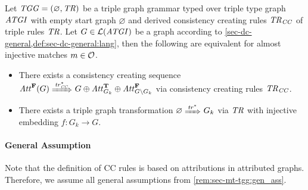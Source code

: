 \begin{fact}
\label{fact:sec-msynch-tgg:equ_tr_cc}
Let $\mathit{TGG}=(\varnothing,\mathit{TR})$ be a triple graph grammar typed over triple type graph $\mathit{ATGI}$ with empty start graph $\varnothing$ and derived consistency creating rules $\mathit{TR}_\mathit{CC}$ of triple rules $\mathit{TR}$.
Let $G \in \mathcal{L}(\mathit{ATGI})$ be a graph according to \cref{sec-dc-general,def:sec-dc-general:lang}, then the following are equivalent for almost injective matches $m \in {\cal O}$.
\begin{itemize}
	\item There exists a consistency creating sequence $\Att^\False(G) \Trans{\tr_\CC^*} G \oplus \Att_{G_k}^\True \oplus \Att_{G \setminus G_k}^\False$ via consistency creating rules $\mathit{TR}_\mathit{CC}$.%
	\item There exists a triple graph transformation $\varnothing \Trans{\tr^*} G_k$ via $\mathit{TR}$ with injective embedding $f\colon G_k \to G$.%
\envEndMarker
\end{itemize}
\end{fact}

\paragraph*{General Assumption}
Note that the definition of CC rules is based on attributions in attributed graphs.
Therefore, we assume all general assumptions from \cref{rem:sec-mt-tgg:gen_ass}. 